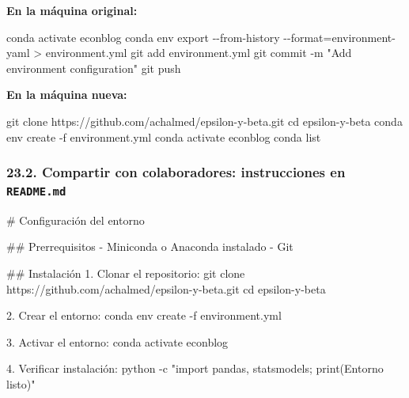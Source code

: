 \documentclass[
  doc,
  floatsintext,
  longtable,
  a4paper,
  nolmodern,
  notxfonts,
  notimes,
  12pt,
  colorlinks=true,linkcolor=blue,citecolor=blue,urlcolor=blue]{apa7}
\newenvironment{Shaded}{\begin{snugshade}}{\end{snugshade}}
\newcommand{\AttributeTok}[1]{\textcolor[rgb]{0.40,0.45,0.13}{#1}}
\newcommand{\BuiltInTok}[1]{\textcolor[rgb]{0.00,0.23,0.31}{#1}}
\newcommand{\ExtensionTok}[1]{\textcolor[rgb]{0.00,0.23,0.31}{#1}}
\newcommand{\FunctionTok}[1]{\textcolor[rgb]{0.28,0.35,0.67}{#1}}
\newcommand{\NormalTok}[1]{\textcolor[rgb]{0.00,0.23,0.31}{#1}}
\newcommand{\OperatorTok}[1]{\textcolor[rgb]{0.37,0.37,0.37}{#1}}
\newcommand{\SpecialStringTok}[1]{\textcolor[rgb]{0.13,0.47,0.30}{#1}}
\newcommand{\StringTok}[1]{\textcolor[rgb]{0.13,0.47,0.30}{#1}}
\begin{document}
\textbf{En la máquina original:}

\begin{Shaded}
\begin{Highlighting}[]
\ExtensionTok{conda}\NormalTok{ activate econblog}
\ExtensionTok{conda}\NormalTok{ env export }\AttributeTok{{-}{-}from{-}history} \AttributeTok{{-}{-}format}\OperatorTok{=}\NormalTok{environment{-}yaml }\OperatorTok{\textgreater{}}\NormalTok{ environment.yml}
\FunctionTok{git}\NormalTok{ add environment.yml}
\FunctionTok{git}\NormalTok{ commit }\AttributeTok{{-}m} \StringTok{"Add environment configuration"}
\FunctionTok{git}\NormalTok{ push}
\end{Highlighting}
\end{Shaded}

\textbf{En la máquina nueva:}

\begin{Shaded}
\begin{Highlighting}[]
\FunctionTok{git}\NormalTok{ clone https://github.com/achalmed/epsilon{-}y{-}beta.git}
\BuiltInTok{cd}\NormalTok{ epsilon{-}y{-}beta}
\ExtensionTok{conda}\NormalTok{ env create }\AttributeTok{{-}f}\NormalTok{ environment.yml}
\ExtensionTok{conda}\NormalTok{ activate econblog}
\ExtensionTok{conda}\NormalTok{ list}
\end{Highlighting}
\end{Shaded}

\subsubsection{\texorpdfstring{23.2. Compartir con colaboradores:
instrucciones en
\texttt{README.md}}{23.2. Compartir con colaboradores: instrucciones en README.md}}\label{compartir-con-colaboradores-instrucciones-en-readme.md}

\begin{Shaded}
\begin{Highlighting}[]
\FunctionTok{\# Configuración del entorno}

\FunctionTok{\#\# Prerrequisitos}
\SpecialStringTok{{-} }\NormalTok{Miniconda o Anaconda instalado}
\SpecialStringTok{{-} }\NormalTok{Git}

\FunctionTok{\#\# Instalación}
\SpecialStringTok{1. }\NormalTok{Clonar el repositorio:}
\NormalTok{   git clone https://github.com/achalmed/epsilon{-}y{-}beta.git}
\NormalTok{   cd epsilon{-}y{-}beta}

\SpecialStringTok{2. }\NormalTok{Crear el entorno:}
\NormalTok{   conda env create {-}f environment.yml}

\SpecialStringTok{3. }\NormalTok{Activar el entorno:}
\NormalTok{   conda activate econblog}

\SpecialStringTok{4. }\NormalTok{Verificar instalación:}
\NormalTok{   python {-}c "import pandas, statsmodels; print(\textquotesingle{}Entorno listo\textquotesingle{})"}
\end{Highlighting}
\end{Shaded}
\end{document}
